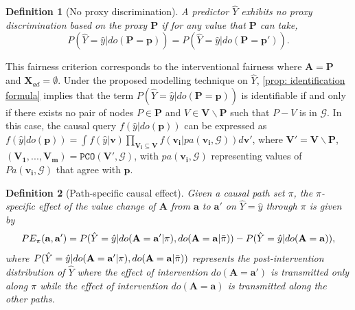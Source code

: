\documentclass{article} %
\newtheorem{definition}{Definition}[section]
\begin{document}
\begin{definition}[No proxy discrimination]\citep{kilbertus2017avoiding}
    A predictor $\hat{Y}$ exhibits no proxy discrimination based on the proxy $\mathbf{P}$ if for any value that $\mathbf{P}$ can take, 
    \begin{equation*}
    P(\hat{Y}=\hat{y}|do(\mathbf{P}=\mathbf{p}))=P(\hat{Y}=\hat{y}|do(\mathbf{P}=\mathbf{p'})).
    \end{equation*}
\end{definition}
This fairness criterion corresponds to the interventional fairness where $\mathbf{A}=\mathbf{P}$ and $\mathbf{X}_{ad}=\emptyset$. Under the proposed modelling technique on $\hat{Y}$, \cref{prop: identification formula} implies that the term $P(\hat{Y}=\hat{y}|do(\mathbf{P}=\mathbf{p}))$ is identifiable if and only if there exists no pair of nodes $P \in \mathbf{P}$ and $V \in \mathbf{V} \backslash \mathbf{P}$ such that $P - V$ is in $\mathcal{G}$. In this case, the causal query $f(\hat{y}|do(\mathbf{p}))$ can be expressed as $f(\hat{y}|do(\mathbf{p})) = \int f(\hat{y}|\mathbf{v}) \prod_{\mathbf{V_i} \subseteq \mathbf{V}} f(\mathbf{v_i}|pa(\mathbf{v_i}, \mathcal{G})) d \mathbf{v'}$, where $\mathbf{V'}= \mathbf{V} \backslash \mathbf{P}$, $(\mathbf{V_1,...,V_m})=\texttt{PCO}(\mathbf{V'}, \mathcal{G})$, with $pa(\mathbf{v_i}, \mathcal{G})$ representing values of $Pa(\mathbf{v_i}, \mathcal{G})$ that agree with $\mathbf{p}$.

\begin{definition}[Path-specific causal effect]\citep{avin2005identifiability}
    Given a causal path set $\pi$, the $\pi$-specific effect of the value change of $\mathbf{A}$ from $\mathbf{a}$ to $\mathbf{a'}$ on $\hat{Y}=\hat{y}$ through $\pi$ is given by
    \begin{equation*}
        PE_{\pi}(\mathbf{a},\mathbf{a'})=P(\hat{Y}=\hat{y}|do(\mathbf{A}=\mathbf{a'}|\pi), do(\mathbf{A}=\mathbf{a}|\Bar{\pi}))-P(\hat{Y}=\hat{y}|do(\mathbf{A}=\mathbf{a})),
    \end{equation*}
    where $P(\hat{Y}=\hat{y}|do(\mathbf{A=a'}|\pi), do(\mathbf{A=a}|\Bar{\pi}))$ represents the post-intervention distribution of $\hat{Y}$ where the effect of intervention $do(\mathbf{A=a'})$ is transmitted only along $\pi$ while the effect of intervention $do(\mathbf{A=a})$ is transmitted along the other paths.
\end{definition}
\end{document}
